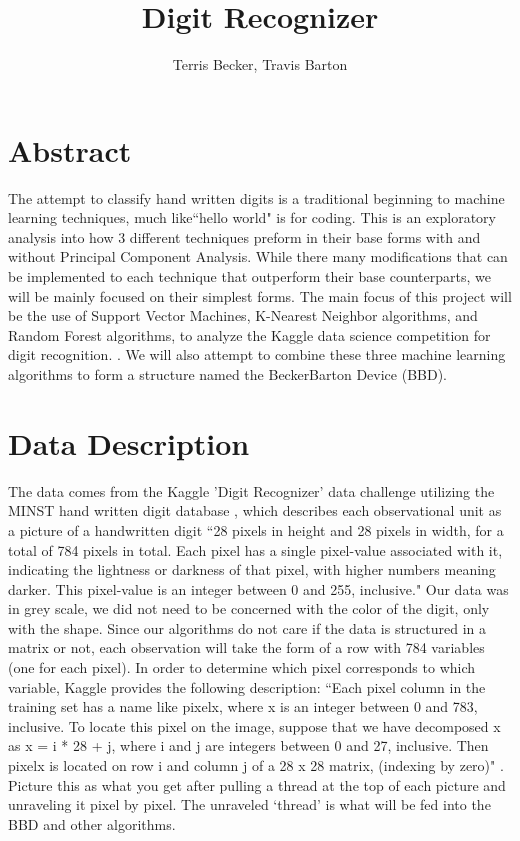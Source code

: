 \documentclass[11pt, oneside]{article}   	%
\title{Digit Recognizer}
\author{Terris Becker, Travis Barton}
\begin{document}
\maketitle
\section{Abstract}
The attempt to classify hand written digits is a traditional beginning to machine learning techniques, much like``hello world" is for coding. This is an exploratory analysis into how 3 different techniques preform in their base forms with and without Principal Component Analysis. While there many modifications that can be implemented to each technique that outperform their base counterparts, we will be mainly focused on their simplest forms. The main focus of this project will be the use of Support Vector Machines, K-Nearest Neighbor algorithms, and Random Forest algorithms, to analyze the Kaggle data science competition for digit recognition. \cite{kagglechallange}. We will also attempt to combine these three machine learning algorithms to form a structure named the BeckerBarton Device (BBD). 

\section{Data Description}
The data comes from the Kaggle 'Digit Recognizer' data challenge utilizing the MINST hand written digit database \cite{kaggledata}, which describes each observational unit as a picture of a handwritten digit ``28 pixels in height and 28 pixels in width, for a total of 784 pixels in total. Each pixel has a single pixel-value associated with it, indicating the lightness or darkness of that pixel, with higher numbers meaning darker. This pixel-value is an integer between 0 and 255, inclusive." Our data was in grey scale, we did not need to be concerned with the color of the digit, only with the shape.
Since our algorithms do not care if the data is structured in a matrix or not, each observation will take the form of a row with 784 variables (one for each pixel). In order to determine which pixel corresponds to which variable, Kaggle provides the following description: ``Each pixel column in the training set has a name like pixelx, where x is an integer between 0 and 783, inclusive. To locate this pixel on the image, suppose that we have decomposed x as x = i * 28 + j, where i and j are integers between 0 and 27, inclusive. Then pixelx is located on row i and column j of a 28 x 28 matrix, (indexing by zero)" \cite{kaggledata}. Picture this as what you get after pulling a thread at the top of each picture and unraveling it pixel by pixel. The unraveled `thread' is what will be fed into the BBD and other algorithms.
\end{document}
